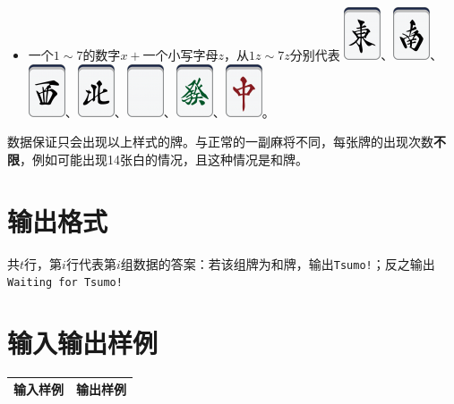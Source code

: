 \documentclass[
	lang=cn,
	color=green
]{elegantbook}
\begin{document}
\begin{itemize}
	\item 一个$1 \sim 7$的数字$x+$一个小写字母$z$，从$1z \sim 7z$分别代表 \includegraphics[scale=0.5]{images/mahjong/1z.png}、\includegraphics[scale=0.5]{images/mahjong/2z.png}、\includegraphics[scale=0.5]{images/mahjong/3z.png}、\includegraphics[scale=0.5]{images/mahjong/4z.png}、\includegraphics[scale=0.5]{images/mahjong/5z.png}、\includegraphics[scale=0.5]{images/mahjong/6z.png}、\includegraphics[scale=0.5]{images/mahjong/7z.png}。
\end{itemize}

数据保证只会出现以上样式的牌。与正常的一副麻将不同，每张牌的出现次数\textbf{不限}，例如可能出现14张白的情况，且这种情况是和牌。

\section*{输出格式}
共$t$行，第$i$行代表第$i$组数据的答案：若该组牌为和牌，输出\lstinline{Tsumo!}；反之输出\lstinline{Waiting for Tsumo!}

\section*{输入输出样例}
\begin{tabularx}{450pt}{X|X}
	\toprule
	输入样例 & 输出样例 \\
	\midrule

	\bottomrule
\end{tabularx}
\end{document}
